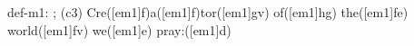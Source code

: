 def-m1: \grealign;
(c3) Cre([em1]f)a([em1]f)tor([em1]gv) of([em1]hg) the([em1]fe) world([em1]fv) we([em1]e) pray:([em1]d)